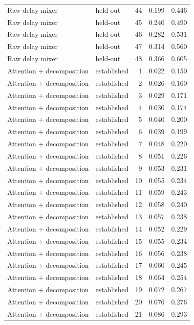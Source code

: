 \begin{tabular}{llrrr}
Raw delay mixer & held-out & 44 & 0.199 & 0.446 \\
Raw delay mixer & held-out & 45 & 0.240 & 0.490 \\
Raw delay mixer & held-out & 46 & 0.282 & 0.531 \\
Raw delay mixer & held-out & 47 & 0.314 & 0.560 \\
Raw delay mixer & held-out & 48 & 0.366 & 0.605 \\
Attention + decomposition & established & 1 & 0.022 & 0.150 \\
Attention + decomposition & established & 2 & 0.026 & 0.160 \\
Attention + decomposition & established & 3 & 0.029 & 0.171 \\
Attention + decomposition & established & 4 & 0.030 & 0.174 \\
Attention + decomposition & established & 5 & 0.040 & 0.200 \\
Attention + decomposition & established & 6 & 0.039 & 0.199 \\
Attention + decomposition & established & 7 & 0.048 & 0.220 \\
Attention + decomposition & established & 8 & 0.051 & 0.226 \\
Attention + decomposition & established & 9 & 0.053 & 0.231 \\
Attention + decomposition & established & 10 & 0.055 & 0.234 \\
Attention + decomposition & established & 11 & 0.059 & 0.243 \\
Attention + decomposition & established & 12 & 0.058 & 0.240 \\
Attention + decomposition & established & 13 & 0.057 & 0.238 \\
Attention + decomposition & established & 14 & 0.052 & 0.229 \\
Attention + decomposition & established & 15 & 0.055 & 0.234 \\
Attention + decomposition & established & 16 & 0.056 & 0.238 \\
Attention + decomposition & established & 17 & 0.060 & 0.245 \\
Attention + decomposition & established & 18 & 0.064 & 0.254 \\
Attention + decomposition & established & 19 & 0.072 & 0.267 \\
Attention + decomposition & established & 20 & 0.076 & 0.276 \\
Attention + decomposition & established & 21 & 0.086 & 0.293 \\

\end{tabular}
